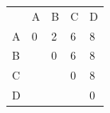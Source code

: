 \begin{parts}
\begin{table}[H]
\centering
\begin{tabular}{lllll}
                       & A                      & B                                              & C                                              & D                                              \\ \cline{2-5} 
\multicolumn{1}{l|}{A} & \multicolumn{1}{l|}{0} & \multicolumn{1}{l|}{\cellcolor[HTML]{CCE5FF}2} & \multicolumn{1}{l|}{\cellcolor[HTML]{CCE5FF}6} & \multicolumn{1}{l|}{\cellcolor[HTML]{CCE5FF}8} \\ \cline{2-5} 
B                      & \multicolumn{1}{l|}{}  & \multicolumn{1}{l|}{0}                         & \multicolumn{1}{l|}{\cellcolor[HTML]{CCE5FF}6} & \multicolumn{1}{l|}{\cellcolor[HTML]{CCE5FF}8} \\ \cline{3-5} 
C                      &                        & \multicolumn{1}{l|}{}                          & \multicolumn{1}{l|}{0}                         & \multicolumn{1}{l|}{\cellcolor[HTML]{CCE5FF}8} \\ \cline{4-5} 
D                      &                        &                                                & \multicolumn{1}{l|}{}                          & \multicolumn{1}{l|}{0}                         \\ \cline{5-5} 
\end{tabular}
\end{table}

\end{parts}

